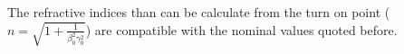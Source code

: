 The refractive indices than can be calculate from the turn on point ($n = \sqrt{1+\frac{1}{\beta_0^2\gamma_0^2}}$) are compatible with the nominal values quoted before.



